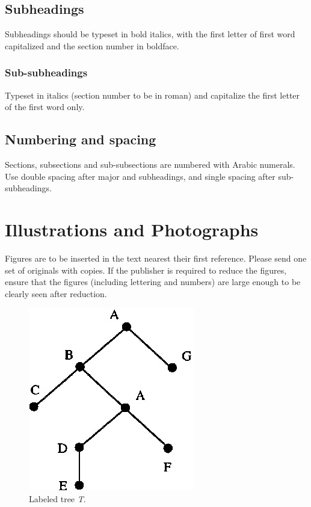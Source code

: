 \documentclass{ws-jai}
\begin{document}
\subsection{Subheadings}
Subheadings should be typeset in bold italics, with the first
letter of first word capitalized and the section number in
boldface.

\subsubsection{Sub-subheadings}
Typeset in italics (section number to be in roman) and capitalize
the first letter of the first word only.

\subsection{Numbering and spacing}
Sections, subsections and sub-subsections are numbered with Arabic
numerals. Use double spacing after major and subheadings, and
single spacing after sub-subheadings.

\section{Illustrations and Photographs}
Figures are to be inserted in the text nearest their
first reference. Please send one set of originals with copies. If the
publisher is required to reduce the figures, ensure that the
figures (including lettering and numbers) are large enough to be
clearly seen after reduction.

\begin{figure}[h]
\begin{center}
\includegraphics{jaif1} %
\end{center}
\caption{Labeled tree {\it T}.}
\label{aba:fig1}
\end{figure}
\end{document}
